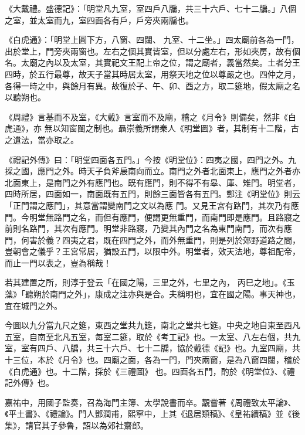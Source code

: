 \begin{pinyinscope}
 《大戴禮。盛德記》：「明堂凡九室，室四戶八牖，共三十六戶、七十二牖。」八個之室，並太室而九，室四面各有戶，戶旁夾兩牖也。



 《白虎通》：「明堂上圓下方，八窗、四闥、
 九室、十二坐。」四太廟前各為一門，出於堂上，門旁夾兩窗也。左右之個其實皆室，但以分處左右，形如夾房，故有個名。太廟之內以及太室，其實祀文王配上帝之位，謂之廟者，義當然矣。土者分王四時，於五行最尊，故天子當其時居太室，用祭天地之位以尊嚴之也。四仲之月，各得一時之中，與餘月有異。故復於子、午、卯、酉之方，取二筵地，假太廟之名以聽朔也。



 《周禮》言基而不及室，《大戴》言室而不及廟，稽之《月令》則備矣，然非《白虎通》，亦
 無以知窗闥之制也。聶崇義所謂秦人《明堂圖》者，其制有十二階，古之遺法，當亦取之。



 《禮記外傳》曰：「明堂四面各五門。」今按《明堂位》：四夷之國，四門之外。九採之國，應門之外。時天子負斧扆南向而立。南門之外者北面東上，應門之外者亦北面東上，是南門之外有應門也。既有應門，則不得不有皋、庫、雉門。明堂者，四時所居，四面如一，南面既有五門，則餘三面皆各有五門。鄭注《明堂位》則云「正門謂之應門」，其意當謂變南門之文以為應
 門。又見王宮有路門，其次乃有應門。今明堂無路門之名，而但有應門，便謂更無重門，而南門即是應門。且路寢之前則名路門，其次有應門。明堂非路寢，乃變其內門之名為東門南門，而次有應門，何害於義？四夷之君，既在四門之外，而外無重門，則是列於郊野道路之間，豈朝會之儀乎？王宮常居，猶設五門，以限中外。明堂者，效天法地，尊祖配帝，而止一門以表之，豈為稱哉！



 若其建置之所，則淳于登云「在國之陽，三里之外，七里之內，
 丙巳之地」。《玉藻》「聽朔於南門之外」，康成之注亦與是合。夫稱明也，宜在國之陽。事天神也，宜在城門之外。



 今圖以九分當九尺之筵，東西之堂共九筵，南北之堂共七筵。中央之地自東至西凡五室，自南至北凡五室，每室二筵，取於《考工記》也。一太室、八左右個，共九室，室有四戶、八牖，共三十六戶、七十二牖，協於戴德《記》也。九室四廟，共十三位，本於《月令》也。四廟之面，各為一門，門夾兩窗，是為八窗四闥，稽於《白虎通》也。十二階，採於《三禮圖》
 也。四面各五門，酌於《明堂位》、《禮記外傳》也。



 嘉祐中，用國子監奏，召為海門主簿、太學說書而卒。覯嘗著《周禮致太平論》、《平土書》、《禮論》。門人鄧潤甫，熙寧中，上其《退居類稿》、《皇祐續稿》並《後集》，請官其子參魯，詔以為郊社齋郎。




\end{pinyinscope}
